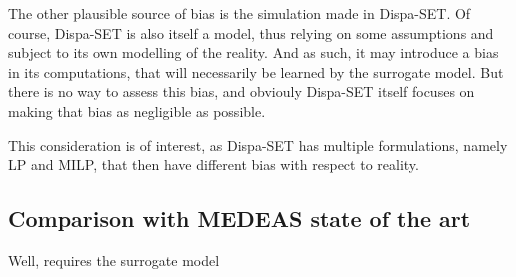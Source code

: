 The other plausible source of bias is the simulation made in Dispa-SET. Of course, Dispa-SET is also itself a model, thus relying on some assumptions and subject to its own modelling of the reality. And as such, it may introduce a bias in its computations, that will necessarily be learned by the surrogate model. But there is no way to assess this bias, and obviouly Dispa-SET itself focuses on making that bias as negligible as possible.

This consideration is of interest, as Dispa-SET has multiple formulations, namely LP and MILP, that then have different bias with respect to reality.

\subsection{Comparison with MEDEAS state of the art}

Well, requires the surrogate model

